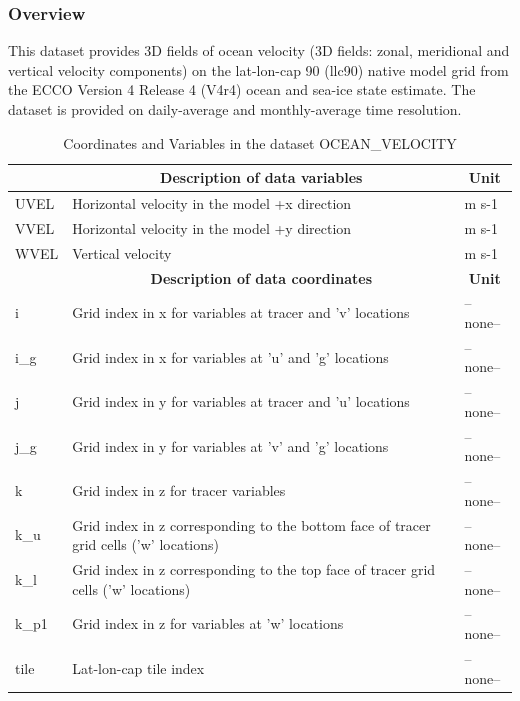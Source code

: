 \subsubsection{Overview}
This dataset provides 3D fields of ocean velocity (3D fields: zonal, meridional and vertical velocity components) on the lat-lon-cap 90 (llc90) native model grid from the ECCO Version 4 Release 4 (V4r4) ocean and sea-ice state estimate. The dataset is provided on daily-average and monthly-average time resolution. 
\begin{longtable}{|m{}|m{}|m{}|}
\caption{Coordinates and Variables in the dataset OCEAN\_VELOCITY}
\label{tab:table-OCEAN_VELOCITY-fields} \\ 
\hline \endhead \hline \endfoot
\rowcolor{lightgray} \multicolumn{1}{|c|}{\textbf{Variables}} & \multicolumn{1}{|c|}{\textbf{Description of data variables}} &  \multicolumn{1}{|c|}{\textbf{Unit}}\\ \hline
UVEL &Horizontal velocity in the model +x direction &m s-1  \\ \hline
VVEL &Horizontal velocity in the model +y direction &m s-1  \\ \hline
WVEL &Vertical velocity &m s-1  \\ \hline
\rowcolor{lightgray} \multicolumn{1}{|c|}{\textbf{Coordinates}} & \multicolumn{1}{|c|}{\textbf{Description of data coordinates}} &  \multicolumn{1}{|c|}{\textbf{Unit}}\\ \hline
i &Grid index in x for variables at tracer and 'v' locations &--none--  \\ \hline
i\_g &Grid index in x for variables at 'u' and 'g' locations &--none--  \\ \hline
j &Grid index in y for variables at tracer and 'u' locations &--none--  \\ \hline
j\_g &Grid index in y for variables at 'v' and 'g' locations &--none--  \\ \hline
k &Grid index in z for tracer variables &--none--  \\ \hline
k\_u &Grid index in z corresponding to the bottom face of tracer grid cells ('w' locations) &--none--  \\ \hline
k\_l &Grid index in z corresponding to the top face of tracer grid cells ('w' locations) &--none--  \\ \hline
k\_p1 &Grid index in z for variables at 'w' locations &--none--  \\ \hline
tile &Lat-lon-cap tile index &--none--  \\ \hline

\end{longtable}

